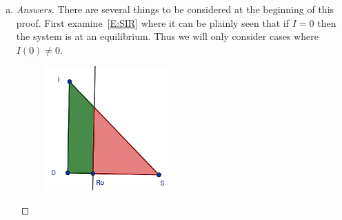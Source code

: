 \documentclass[12pt]{article}
\begin{document}
\begin{enumerate}[(a)]
\begin{enumerate}[(i)]
{\begin{proof}[Solution]
\end{proof}
}
  
  
  \item \basicSIRanalQbiv
{\color{blue}
\begin{proof}[Solution]
	
	Yes it is possible to find an exact analytical expression for t(S). The same steps from part (i) can be taken, except R is solved for as a function of S (separable equation) when combining $dS/dt$ and $dR/dt$, and the $dS/dt$ equation is solved for I to achieve a relation between $dS/dt$ and I to substitute into the$ S+I+R=1$ equation. Carrying on as in part (i) R and I can now be replaced in $S+I+R=1$ and the equation can be solved as a separable equation, giving t as a function of S or t(S).

\end{proof}
}  
  
  \end{enumerate}
\item \basicSIRanalQc

{\color{blue}
\begin{proof}[Answers]

There are several things to be considered at the beginning of this proof. First examine~\eqref{E:SIR} where it can be plainly seen that if $I=0$ then the system is at an equilibrium. Thus we will only consider cases where $I(0)\neq 0$.

\begin{figure}[h]
\begin{center}
		\includegraphics[width=5cm]{images/4MB3_A1_2c.png}
\end{center}
\end{figure}


\end{proof}}
\end{enumerate}
\end{document}
